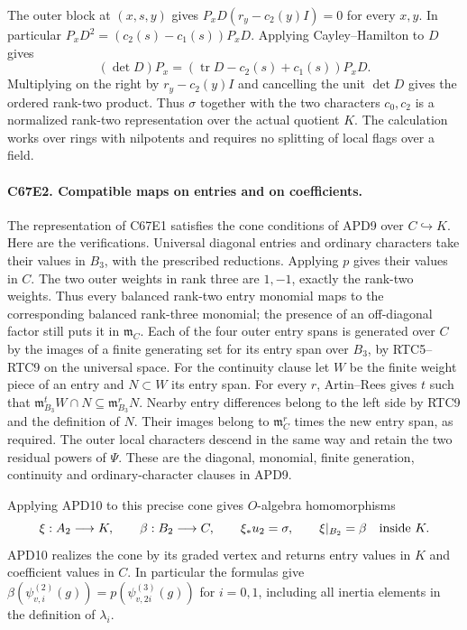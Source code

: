 The outer block at $(x,s,y)$ gives
$P_xD(r_y-c_2(y)I)=0$ for every $x,y$. In particular
$P_xD^2=(c_2(s)-c_1(s))P_xD$. Applying Cayley--Hamilton to $D$ gives
\[
    (\det D)P_x=(\operatorname{tr}D-c_2(s)+c_1(s))P_xD .
\]
Multiplying on the right by $r_y-c_2(y)I$ and cancelling the unit
$\det D$ gives the ordered rank-two product.
Thus $\sigma$ together with the two characters $c_0,c_2$ is
a normalized rank-two representation over the actual quotient $K$.
The calculation works over rings with nilpotents and requires no
splitting of local flags over a field.

\paragraph{C67E2. Compatible maps on entries and on coefficients.}
The representation of C67E1 satisfies the cone conditions of APD9
over $C\hookrightarrow K$. Here are the verifications. Universal
diagonal entries and ordinary characters take their values in $B_3$,
with the prescribed reductions. Applying $p$ gives their values in
$C$. The two outer weights in rank three are $1,-1$, exactly the
rank-two weights. Thus every balanced rank-two entry monomial maps
to the corresponding balanced rank-three monomial; the presence of
an off-diagonal factor still puts it in $\mathfrak m_C$. Each of
the four outer entry spans is generated over $C$ by the images of a
finite generating set for its entry span over $B_3$, by RTC5--RTC9
on the universal space. For the continuity clause let $W$ be the
finite weight piece of an entry and $N\subset W$ its entry span.
For every $r$, Artin--Rees gives $t$ such that
$\mathfrak m_{B_3}^t W\cap N\subseteq\mathfrak m_{B_3}^r N$.
Nearby entry differences belong to the left side by RTC9 and the
definition of $N$. Their images belong to $\mathfrak m_C^r$ times
the new entry span, as required. The outer local characters
descend in the same way and retain the two residual powers of
$\Psi$. These are the diagonal, monomial, finite generation,
continuity and ordinary-character clauses in APD9.

Applying APD10 to this precise cone gives $O$-algebra homomorphisms
\[
  \xi:A_2\longrightarrow K,\qquad \beta:B_2\longrightarrow C,
  \qquad \xi_*u_2=\sigma,\qquad \xi|_{B_2}=\beta
                    \quad\hbox{inside }K .
\]
APD10 realizes the cone by its graded vertex and returns entry values
in $K$ and coefficient values in $C$. In particular the formulas
give $\beta(\psi_{v,i}^{(2)}(g))=p(\psi_{v,2i}^{(3)}(g))$ for
$i=0,1$, including all inertia elements in the definition of $\lambda_i$.

